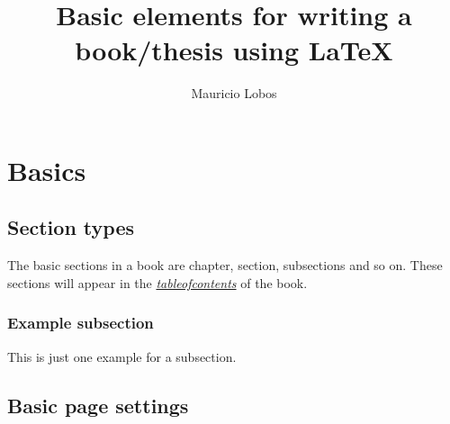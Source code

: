 \documentclass[a4paper]{book}
\newcommand{\imp}[1]{\underline{\textit{#1}}}
\begin{document}

\pagestyle{empty}
\title{Basic elements for writing a book/thesis using \LaTeX}
\author{Mauricio Lobos}
\date{}
\maketitle

\pagestyle{plain}
\listoftodos
\tableofcontents


\chapter{Basics}

\pagestyle{fancy}
\fancyhf{}
\fancyhead[OC]{\leftmark}
\fancyhead[EC]{\rightmark}
\cfoot{\thepage}


\section{Section types}

The basic sections in a book are chapter, section, subsections and so on. These sections will appear in the \imp{tableofcontents} of the book.


\subsection{Example subsection}

This is just one example for a subsection.


\section{Basic page settings}
\end{document}
